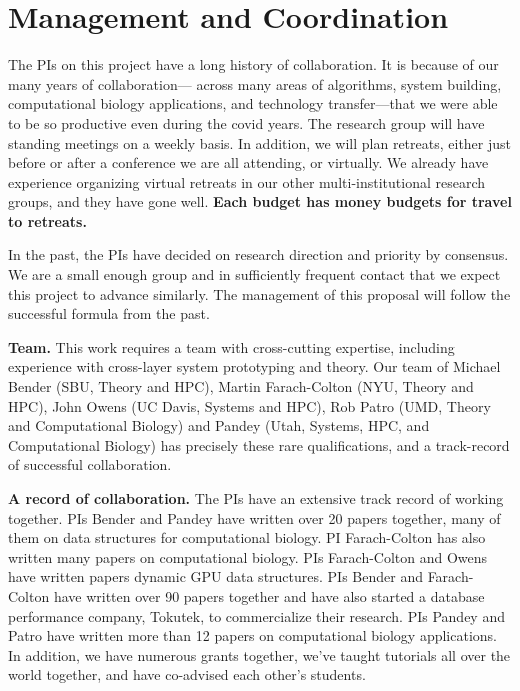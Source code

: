 



 

\thispagestyle{empty}


\section*{Management and Coordination}


The PIs on this project have a long history of collaboration. It is because of our many years of collaboration— across many areas of algorithms, system building, computational biology applications, and technology transfer—that we were able to be so productive even during the covid years.
%
The research group will have standing meetings on a weekly basis.  In addition, we will plan retreats, either just before or after a conference we are all attending, or virtually.  We already have experience organizing virtual retreats in our other multi-institutional research groups, and they have gone well. {\bf Each budget has money budgets for travel to retreats.}

In the past, the PIs have decided on research direction and priority by consensus. We are a small enough group and in sufficiently frequent contact that we expect this project to advance similarly. The management of this proposal will follow the successful formula from the past.

\noindent
{\bf Team.}
This work requires a team with cross-cutting expertise, including experience with cross-layer system prototyping and theory. Our team of Michael Bender (SBU, Theory and HPC), Martin Farach-Colton (NYU, Theory and HPC), John Owens (UC Davis, Systems and HPC), Rob Patro (UMD, Theory and Computational Biology) and Pandey (Utah, Systems, HPC, and Computational Biology) has precisely these rare qualifications, and a track-record of successful collaboration.
%

\noindent
{\bf A record of collaboration.}
The PIs have an extensive track record of working together. PIs Bender and Pandey have written over 20 papers together, many of them on data structures for computational biology.  PI Farach-Colton has also written many papers on computational biology.  PIs Farach-Colton and Owens have written papers dynamic GPU data structures.  PIs Bender and Farach-Colton have written over 90 papers together and have also started a database performance company, Tokutek, to commercialize their research.  PIs Pandey and Patro have written more than 12 papers on computational biology applications. In addition, we have numerous grants together, we've taught tutorials all over the world together, and have co-advised each other's students. 

